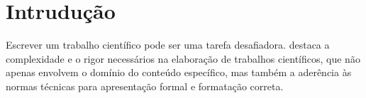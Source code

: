 \chapter{Intrudução}

Escrever um trabalho científico pode ser uma tarefa desafiadora. \cite{severino} 
destaca a complexidade e o rigor necessários na elaboração de trabalhos científicos, que não
apenas envolvem o domínio do conteúdo específico, mas também a aderência às normas
técnicas para apresentação formal e formatação correta.